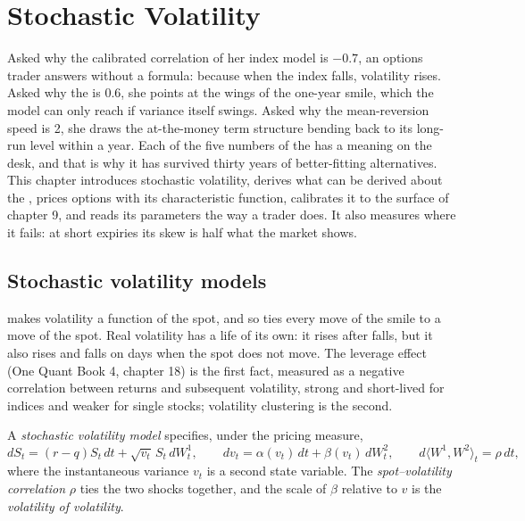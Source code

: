 \chapter{Stochastic Volatility}\label{ch:dv:stochastic-volatility}

Asked why the calibrated correlation of her index model is $-0.7$, an options trader answers
without a formula: because when the index falls, volatility rises. Asked why the  is 0.6, she points at the wings of the one-year smile, which the model can only
reach if variance itself swings. Asked why the mean-reversion speed is 2, she draws the
at-the-money term structure bending back to its long-run level within a year. Each of the
five numbers of the  has a meaning on the desk, and that is why it has survived
thirty years of better-fitting alternatives. This chapter introduces stochastic volatility,
derives what can be derived about the , prices options with its characteristic
function, calibrates it to the surface of chapter 9, and reads its parameters the way a trader
does. It also measures where it fails: at short expiries its skew is half what the market
shows.

\section{Stochastic volatility models}

 makes volatility a function of the spot, and so ties every move of the smile to
a move of the spot. Real volatility has a life of its own: it rises after falls, but it also
rises and falls on days when the spot does not move. The leverage effect (One Quant Book 4,
chapter 18) is the first fact, measured as a negative correlation between returns and subsequent
volatility, strong and short-lived for indices and weaker for single stocks; volatility clustering
is the second.

\begin{definition}\label{def:dv:stochastic-volatility:sv}
A \emph{stochastic volatility model} specifies, under the
pricing measure,
\[
dS_t=(r-q)S_t\,dt+\sqrt{v_t}\,S_t\,dW^1_t,\qquad dv_t=\alpha(v_t)\,dt+\beta(v_t)\,dW^2_t,\qquad
d\langle W^1,W^2\rangle_t=\rho\,dt,
\]
where the instantaneous variance $v_t$ is a second state variable. The
\emph{spot--volatility correlation} $\rho$ ties the two
shocks together, and the scale of $\beta$ relative to $v$ is the \emph{volatility of
volatility}.
\end{definition}

